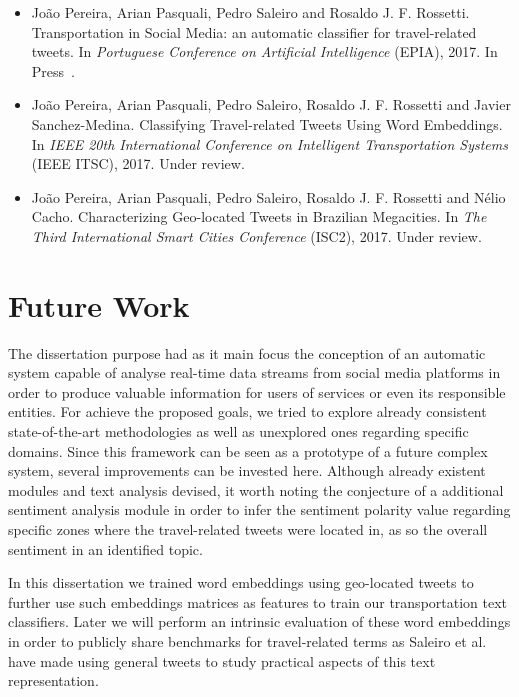 \begin{itemize}
	\item
	João Pereira, Arian Pasquali, Pedro Saleiro and Rosaldo J. F. Rossetti. {\color{blue}Transportation in Social Media: an automatic classifier for travel-related tweets}. In \emph{Portuguese Conference on Artificial Intelligence} (EPIA), 2017. In Press~\cite{pereira2017transport}.
	
	\item
	João Pereira, Arian Pasquali, Pedro Saleiro, Rosaldo J. F. Rossetti and Javier Sanchez-Medina. {\color{blue}Classifying Travel-related Tweets Using Word Embeddings}. In \emph{IEEE 20th International Conference on Intelligent Transportation Systems} (IEEE ITSC), 2017. Under review.
	
	\item
	João Pereira, Arian Pasquali, Pedro Saleiro, Rosaldo J. F. Rossetti and Nélio Cacho. {\color{blue}Characterizing Geo-located Tweets in Brazilian Megacities}. In \emph{The Third International Smart Cities Conference} (ISC2), 2017. Under review.
\end{itemize}

\section{Future Work}

The dissertation purpose had as it main focus the conception of an automatic system capable of analyse real-time data streams from social media platforms in order to produce valuable information for users of services or even its responsible entities. For achieve the proposed goals, we tried to explore already consistent state-of-the-art methodologies as well as unexplored ones regarding specific domains. Since this framework can be seen as a prototype of a future complex system, several improvements can be invested here. Although already existent modules and text analysis devised, it worth noting the conjecture of a additional sentiment analysis module in order to infer the sentiment polarity value regarding specific zones where the travel-related tweets were located in, as so the overall sentiment in an identified topic.

In this dissertation we trained word embeddings using geo-located tweets to further use such embeddings matrices as features to train our transportation text classifiers. Later we will perform an intrinsic evaluation of these word embeddings in order to publicly share benchmarks for travel-related terms as Saleiro et al.~\cite{saleiro2017embeddings} have made using general tweets to study practical aspects of this text representation.

